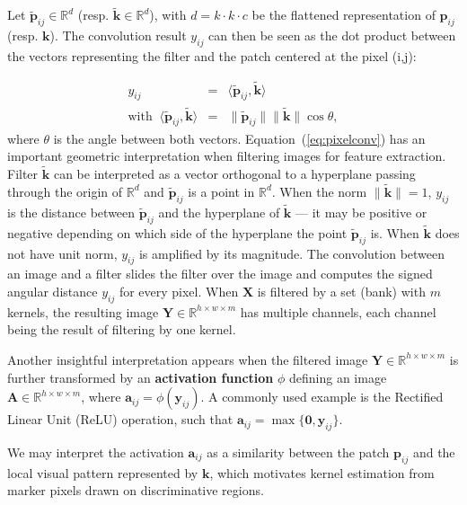 \documentclass[10pt,twocolumn,twoside]{IEEEtran}
\begin{document}
Let $\tilde{\mathbf{p}}_{ij} \in \mathbb{R}^d$ (resp. $\tilde{\mathbf{k}} \in \mathbb{R}^d$), with $d=k \cdot k \cdot c$ be the flattened representation of $\mathbf{p}_{ij}$ (resp. $\mathbf{k}$). The convolution result $y_{ij}$ can then be seen as the dot product between the vectors representing the filter and the patch centered at the pixel (i,j):

\begin{eqnarray}\label{eq:pixelconv}
y_{ij} & = & \langle \tilde{\mathbf{p}}_{ij}, \tilde{\mathbf{k}}\rangle \\
\mbox{with} \;\; \langle \tilde{\mathbf{p}}_{ij}, \tilde{\mathbf{k}}\rangle & = & \|\tilde{\mathbf{p}}_{ij}\| \| \tilde{\mathbf{k}}\| \cos{\theta}, \nonumber
\end{eqnarray}
where $\theta$ is the angle between both vectors. Equation~(\ref{eq:pixelconv}) has an important geometric interpretation when filtering images for feature extraction. Filter $\mathbf{\tilde{k}}$ can be interpreted as a vector orthogonal to a hyperplane passing through the origin of $\mathbb{R}^{d}$ and $\tilde{\mathbf{p}}_{ij}$ is a point in $\mathbb{R}^{d}$. When the norm $\|\tilde{\mathbf{k}}\|=1$, $y_{ij}$ is the distance between $\tilde{\mathbf{p}}_{ij}$ and the hyperplane of $\mathbf{\tilde{k}}$ --- it may be positive or negative depending on which side of the hyperplane the point $\tilde{\mathbf{p}}_{ij}$ is. When $\tilde{\mathbf{k}}$ does not have unit norm, $y_{ij}$ is amplified by its magnitude. The convolution between an image and a filter slides the filter over the image and computes the signed angular distance $y_{ij}$ for every pixel. When $\mathbf{X}$ is filtered by a set (bank) with $m$ kernels, the resulting image $\mathbf{Y} \in \mathbb{R}^{h\times w\times m}$ has multiple channels, each channel being the result of filtering by one kernel. 

Another insightful interpretation appears when the filtered image $\mathbf{Y} \in \mathbb{R}^{h\times w\times m}$ is further transformed by an \textbf{activation function} $\phi$ defining an image $\mathbf{A} \in \mathbb{R}^{h\times w\times m}$, where $\mathbf{a}_{ij}=\phi(\mathbf{y}_{ij})$. A commonly used example is the Rectified Linear Unit (ReLU) operation, such that $\mathbf{a}_{ij} = \max\{\mathbf{0},\mathbf{y}_{ij}\}$.

We may interpret the activation $\mathbf{a}_{ij}$ as a similarity between the patch $\mathbf{p}_{ij}$ and the local visual pattern represented by $\mathbf{k}$, which motivates kernel estimation from marker pixels drawn on discriminative regions.
\end{document}
